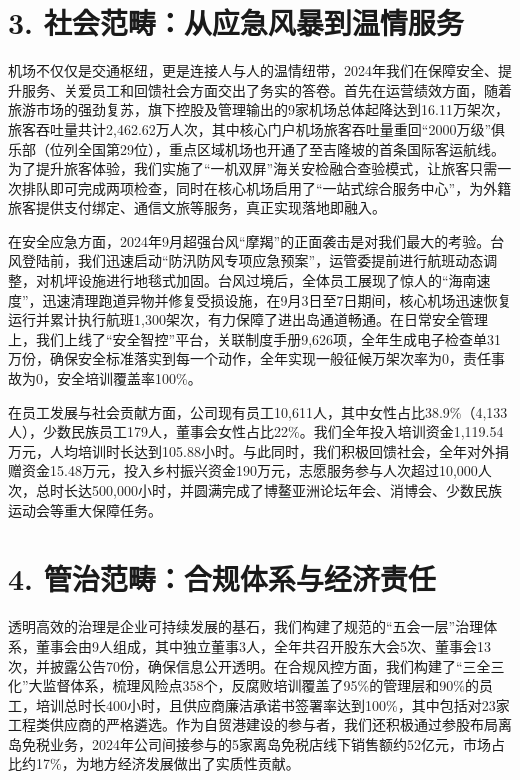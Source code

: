 \documentclass[a4paper,12pt]{article}
\begin{document}
\section{3. 社会范畴：从应急风暴到温情服务}

机场不仅仅是交通枢纽，更是连接人与人的温情纽带，2024年我们在保障安全、提升服务、关爱员工和回馈社会方面交出了务实的答卷。首先在运营绩效方面，随着旅游市场的强劲复苏，旗下控股及管理输出的9家机场总体起降达到16.11万架次，旅客吞吐量共计2,462.62万人次，其中核心门户机场旅客吞吐量重回“2000万级”俱乐部（位列全国第29位），重点区域机场也开通了至吉隆坡的首条国际客运航线。为了提升旅客体验，我们实施了“一机双屏”海关安检融合查验模式，让旅客只需一次排队即可完成两项检查，同时在核心机场启用了“一站式综合服务中心”，为外籍旅客提供支付绑定、通信文旅等服务，真正实现落地即融入。

在安全应急方面，2024年9月超强台风“摩羯”的正面袭击是对我们最大的考验。台风登陆前，我们迅速启动“防汛防风专项应急预案”，运管委提前进行航班动态调整，对机坪设施进行地毯式加固。台风过境后，全体员工展现了惊人的“海南速度”，迅速清理跑道异物并修复受损设施，在9月3日至7日期间，核心机场迅速恢复运行并累计执行航班1,300架次，有力保障了进出岛通道畅通。在日常安全管理上，我们上线了“安全智控”平台，关联制度手册9,626项，全年生成电子检查单31万份，确保安全标准落实到每一个动作，全年实现一般征候万架次率为0，责任事故为0，安全培训覆盖率100\%。

在员工发展与社会贡献方面，公司现有员工10,611人，其中女性占比38.9\%（4,133人），少数民族员工179人，董事会女性占比22\%。我们全年投入培训资金1,119.54万元，人均培训时长达到105.88小时。与此同时，我们积极回馈社会，全年对外捐赠资金15.48万元，投入乡村振兴资金190万元，志愿服务参与人次超过10,000人次，总时长达500,000小时，并圆满完成了博鳌亚洲论坛年会、消博会、少数民族运动会等重大保障任务。

\section{4. 管治范畴：合规体系与经济责任}

透明高效的治理是企业可持续发展的基石，我们构建了规范的“五会一层”治理体系，董事会由9人组成，其中独立董事3人，全年共召开股东大会5次、董事会13次，并披露公告70份，确保信息公开透明。在合规风控方面，我们构建了“三全三化”大监督体系，梳理风险点358个，反腐败培训覆盖了95\%的管理层和90\%的员工，培训总时长400小时，且供应商廉洁承诺书签署率达到100\%，其中包括对23家工程类供应商的严格遴选。作为自贸港建设的参与者，我们还积极通过参股布局离岛免税业务，2024年公司间接参与的5家离岛免税店线下销售额约52亿元，市场占比约17\%，为地方经济发展做出了实质性贡献。
\end{document}
